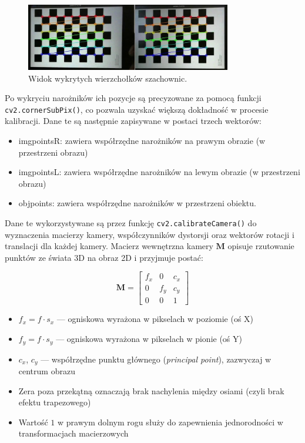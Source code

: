 \documentclass[magisterska]{pracadypl}
\begin{document}
\begin{figure}[H]  %
    \centering  %
    \includegraphics[width=0.8\textwidth]{images/calib.png}  %
    \captionsetup{font=footnotesize}
    \caption[Widok wykrytych wierzchołków szachownic. https://learnopencv.com/making-a-low-cost-stereo-camera-using-opencv/.]{Widok wykrytych wierzchołków szachownic.}
\end{figure}

Po wykryciu narożników ich pozycje są precyzowane za pomocą funkcji \texttt{cv2.cornerSubPix()}, co pozwala uzyskać większą dokładność w procesie kalibracji. Dane te są następnie zapisywane w postaci trzech wektorów:

\begin{itemize}
  \item imgpointsR: zawiera współrzędne narożników na prawym obrazie (w przestrzeni obrazu)
  \item imgpointsL: zawiera współrzędne narożników na lewym obrazie (w przestrzeni obrazu)
  \item objpoints: zawiera współrzędne narożników w przestrzeni obiektu.
\end{itemize}

Dane te wykorzystywane są przez funkcję \texttt{cv2.calibrateCamera()} do wyznaczenia macierzy kamery, współczynników dystorsji oraz wektorów rotacji i translacji dla każdej kamery. Macierz wewnętrzna kamery $\mathbf{M}$ opisuje rzutowanie punktów ze świata 3D na obraz 2D i przyjmuje postać:

\[
\mathbf{M} =
\begin{bmatrix}
f_x & 0 & c_x \\
0 & f_y & c_y \\
0 & 0 & 1
\end{bmatrix}
\]

\begin{itemize}
  \item $f_x = f \cdot s_x$ — ogniskowa wyrażona w pikselach w poziomie (oś X)
  \item $f_y = f \cdot s_y$ — ogniskowa wyrażona w pikselach w pionie (oś Y)
  \item $c_x$, $c_y$ — współrzędne punktu głównego (\textit{principal point}), zazwyczaj w centrum obrazu
  \item Zera poza przekątną oznaczają brak nachylenia między osiami (czyli brak efektu trapezowego)
  \item Wartość $1$ w prawym dolnym rogu służy do zapewnienia jednorodności w transformacjach macierzowych
\end{itemize}
\end{document}
